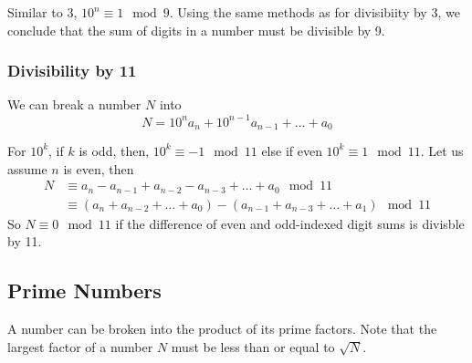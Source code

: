 Similar to 3, $10^n\equiv 1 \mod 9$. Using the same methods as for divisibiity by 3,
we conclude that the sum of digits in a number must be divisible by 9.

\subsubsection{Divisibility by 11}

We can break a number $N$ into
\begin{equation*}
    N=10^na_n + 10^{n-1}a_{n-1} + \ldots + a_0
\end{equation*}

For $10^k$, if $k$ is odd, then, $10^k\equiv -1\mod 11$ else if even $10^k\equiv 1\mod 11$.
Let us assume $n$ is even, then
\begin{align*}
    N&\equiv a_n-a_{n-1}+a_{n-2}-a_{n-3}+\ldots+a_0\mod 11\\
    &\equiv (a_n+a_{n-2}+\ldots+a_0)-(a_{n-1}+a_{n-3}+\ldots+a_1)\mod 11
\end{align*}
So $N\equiv 0\mod 11$ if the difference of even and odd-indexed digit sums is divisble by 11.

\subsection{Prime Numbers}

A number can be broken into the product of its prime factors.
Note that the largest factor of a number $N$ must be less than or equal to $\sqrt{N}$.